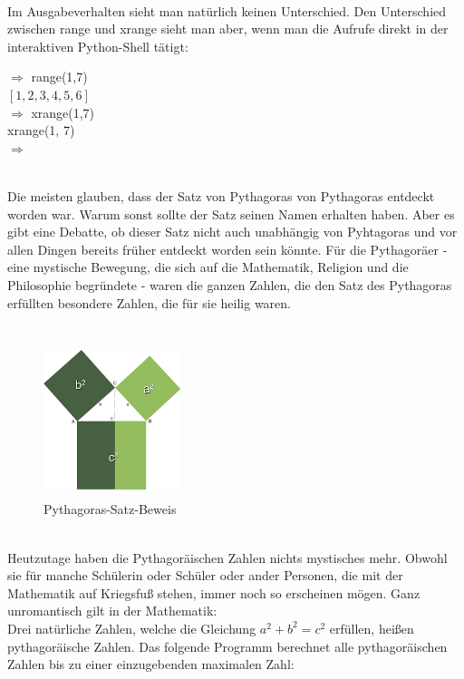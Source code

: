 \\
Im Ausgabeverhalten sieht man natürlich keinen Unterschied. Den Unterschied zwischen range und xrange sieht man aber, wenn man die Aufrufe direkt in der interaktiven Python-Shell tätigt: \\
\begin{MyConsoleBox}{
${\Longrightarrow}$ range(1,7)	\\
$[1, 2, 3, 4, 5, 6]$			\\
${\Longrightarrow}$ xrange(1,7) \\
xrange(1, 7)					\\
${\Longrightarrow}$
}\end{MyConsoleBox}
\\
Die meisten glauben, dass der Satz von Pythagoras von Pythagoras entdeckt worden war. Warum sonst sollte der Satz seinen Namen erhalten haben. Aber es gibt eine Debatte, ob dieser Satz nicht auch unabhängig von Pyhtagoras und vor allen Dingen bereits früher entdeckt worden sein könnte. Für die Pythagoräer - eine mystische Bewegung, die sich auf die Mathematik, Religion und die Philosophie begründete - waren die ganzen Zahlen, die den Satz des Pythagoras erfüllten besondere Zahlen, die für sie heilig waren.
\\
\\
\begin{figure}[h]
\includegraphics[width=4cm,height=4.5cm]{pics/pythagoras_beweis.png}
\caption[Pythagoras-Satz]{Pythagoras-Satz-Beweis}
\label{fig:pythagoras_beweis}
\end{figure}
\\
Heutzutage haben die Pythagoräischen Zahlen nichts mystisches mehr. Obwohl sie für manche Schülerin oder Schüler oder ander Personen, die mit der Mathematik auf Kriegsfuß stehen, immer noch so erscheinen mögen.
Ganz unromantisch gilt in der Mathematik:\\
Drei natürliche Zahlen, welche die Gleichung $a^2 + b^2 = c^2$ erfüllen, heißen pythagoräische Zahlen.
Das folgende Programm berechnet alle pythagoräischen Zahlen bis zu einer einzugebenden maximalen Zahl: \\
